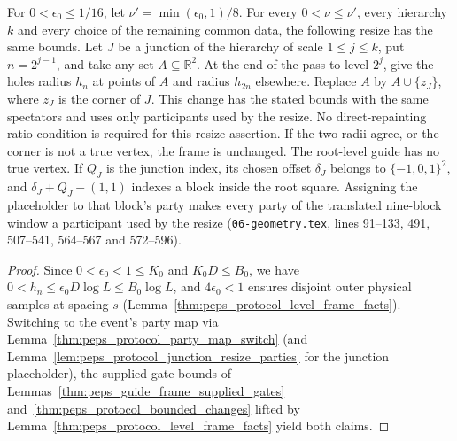 \begin{lemma}
    For $0<\epsilon_0\le1/16$, let $\nu'=\min(\epsilon_0,1)/8$. For every
    $0<\nu\le\nu'$, every hierarchy $k$ and every choice of the remaining common data, the following
    resize has the same bounds. Let $J$ be a junction of the hierarchy of scale
    $1\le j\le k$, put $n=2^{j-1}$, and take any set $A\subseteq\mathbb R^2$. At the
    end of the pass to level $2^j$, give the holes radius $h_n$ at points of $A$ and
    radius $h_{2n}$ elsewhere. Replace $A$ by $A\cup\{z_J\}$, where $z_J$ is the corner
    of $J$. This change has the stated bounds with the same spectators and uses only
    participants used by the resize. No direct-repainting ratio condition is required
    for this resize assertion. If the two radii agree, or the corner is not a true
    vertex, the frame is unchanged. The root-level guide has no true vertex.
    If $Q_J$ is the junction index, its chosen offset $\delta_J$ belongs
    to $\{-1,0,1\}^2$, and $\delta_J+Q_J-(1,1)$ indexes a block inside the root
    square. Assigning the placeholder to that block's party makes every party of
    the translated nine-block window a participant used by the resize
    (\texttt{06-geometry.tex}, lines 91--133, 491, 507--541, 564--567 and 572--596).
\end{lemma}

\begin{proof}\leanok
    Since $0<\epsilon_0<1\le K_0$ and $K_0D\le B_0$, we have $0<h_n\le\epsilon_0D\log L\le B_0\log L$, and $4\epsilon_0<1$ ensures disjoint outer physical samples at spacing $s$ (Lemma~\ref{thm:peps_protocol_level_frame_facts}). Switching to the event's party map via Lemma~\ref{thm:peps_protocol_party_map_switch} (and Lemma~\ref{lem:peps_protocol_junction_resize_parties} for the junction placeholder), the supplied-gate bounds of Lemmas~\ref{thm:peps_guide_frame_supplied_gates} and~\ref{thm:peps_protocol_bounded_changes} lifted by Lemma~\ref{thm:peps_protocol_level_frame_facts} yield both claims.
\end{proof}

